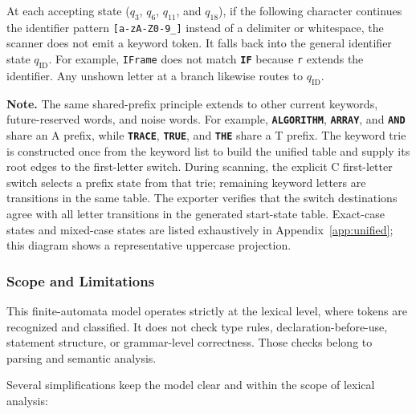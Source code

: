 \documentclass[11pt,a4paper]{article}
\newcommand{\kw}[1]{\texttt{\bfseries\color{pupmaroon}#1}}
\newcommand{\codeinline}[1]{\texttt{#1}}
\newcommand{\note}[1]{%
  \begin{center}\begin{minipage}{0.94\linewidth}
  \colorbox{pupcream}{\parbox{\dimexpr\linewidth-2\fboxsep\relax}{\small\textbf{Note.} #1}}
  \end{minipage}\end{center}}
\begin{document}
At each accepting state ($q_3$, $q_6$, $q_{11}$, and $q_{18}$), if the following character continues the identifier pattern \codeinline{[a-zA-Z0-9\_]} instead of a delimiter or whitespace, the scanner does not emit a keyword token. It falls back into the general identifier state $q_{\mathrm{ID}}$. For example, \codeinline{IFrame} does not match \kw{IF} because \codeinline{r} extends the identifier. Any unshown letter at a branch likewise routes to $q_{\mathrm{ID}}$.

\note{The same shared-prefix principle extends to other current keywords, future-reserved words, and noise words. For example, \kw{ALGORITHM}, \kw{ARRAY}, and \kw{AND} share an A prefix, while \kw{TRACE}, \kw{TRUE}, and \kw{THE} share a T prefix. The keyword trie is constructed once from the keyword list to build the unified table and supply its root edges to the first-letter switch. During scanning, the explicit C first-letter switch selects a prefix state from that trie; remaining keyword letters are transitions in the same table. The exporter verifies that the switch destinations agree with all letter transitions in the generated start-state table. Exact-case states and mixed-case states are listed exhaustively in Appendix~\ref{app:unified}; this diagram shows a representative uppercase projection.}

\subsubsection{Scope and Limitations}

This finite-automata model operates strictly at the lexical level, where tokens are recognized and classified. It does not check type rules, declaration-before-use, statement structure, or grammar-level correctness. Those checks belong to parsing and semantic analysis.

Several simplifications keep the model clear and within the scope of lexical analysis:
\end{document}
